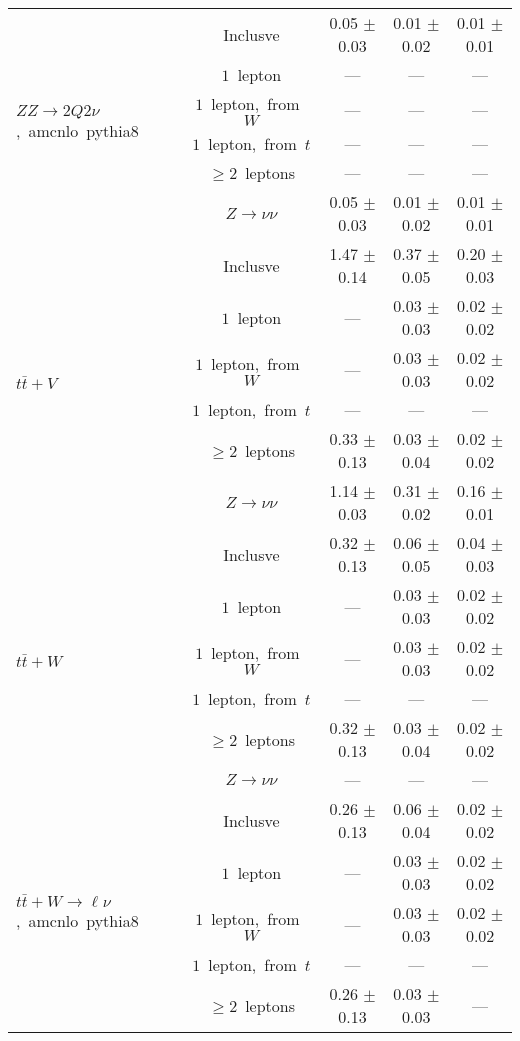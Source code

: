 \documentclass{article}
\begin{document}
\begin{longtable}{|l|c|c|c|c|}
\hline 
\multirow{6}{*}{$ZZ{\rightarrow}2Q2{\nu}$,~amcnlo~pythia8} & Inclusve  & 0.05 $\pm$ 0.03  & 0.01 $\pm$ 0.02  & 0.01 $\pm$ 0.01 \\* 
 & $1$~lepton  & ---  & ---  & --- \\* 
 & $1$~lepton,~from~$W$  & ---  & ---  & --- \\* 
 & $1$~lepton,~from~$t$  & ---  & ---  & --- \\* 
 & $\ge2$~leptons  & ---  & ---  & --- \\* 
 & $Z\rightarrow\nu\nu$  & 0.05 $\pm$ 0.03  & 0.01 $\pm$ 0.02  & 0.01 $\pm$ 0.01 \\* 
\hline 
\multirow{6}{*}{$t\bar{t}+V$} & Inclusve  & 1.47 $\pm$ 0.14  & 0.37 $\pm$ 0.05  & 0.20 $\pm$ 0.03 \\* 
 & $1$~lepton  & ---  & 0.03 $\pm$ 0.03  & 0.02 $\pm$ 0.02 \\* 
 & $1$~lepton,~from~$W$  & ---  & 0.03 $\pm$ 0.03  & 0.02 $\pm$ 0.02 \\* 
 & $1$~lepton,~from~$t$  & ---  & ---  & --- \\* 
 & $\ge2$~leptons  & 0.33 $\pm$ 0.13  & 0.03 $\pm$ 0.04  & 0.02 $\pm$ 0.02 \\* 
 & $Z\rightarrow\nu\nu$  & 1.14 $\pm$ 0.03  & 0.31 $\pm$ 0.02  & 0.16 $\pm$ 0.01 \\* 
\hline 
\multirow{6}{*}{$t\bar{t}+W$} & Inclusve  & 0.32 $\pm$ 0.13  & 0.06 $\pm$ 0.05  & 0.04 $\pm$ 0.03 \\* 
 & $1$~lepton  & ---  & 0.03 $\pm$ 0.03  & 0.02 $\pm$ 0.02 \\* 
 & $1$~lepton,~from~$W$  & ---  & 0.03 $\pm$ 0.03  & 0.02 $\pm$ 0.02 \\* 
 & $1$~lepton,~from~$t$  & ---  & ---  & --- \\* 
 & $\ge2$~leptons  & 0.32 $\pm$ 0.13  & 0.03 $\pm$ 0.04  & 0.02 $\pm$ 0.02 \\* 
 & $Z\rightarrow\nu\nu$  & ---  & ---  & --- \\* 
\hline 
\multirow{6}{*}{$t\bar{t}+W{\rightarrow}{\ell}{\nu}$,~amcnlo~pythia8} & Inclusve  & 0.26 $\pm$ 0.13  & 0.06 $\pm$ 0.04  & 0.02 $\pm$ 0.02 \\* 
 & $1$~lepton  & ---  & 0.03 $\pm$ 0.03  & 0.02 $\pm$ 0.02 \\* 
 & $1$~lepton,~from~$W$  & ---  & 0.03 $\pm$ 0.03  & 0.02 $\pm$ 0.02 \\* 
 & $1$~lepton,~from~$t$  & ---  & ---  & --- \\* 
 & $\ge2$~leptons  & 0.26 $\pm$ 0.13  & 0.03 $\pm$ 0.03  & --- \\* 

\end{longtable}
\end{document}

